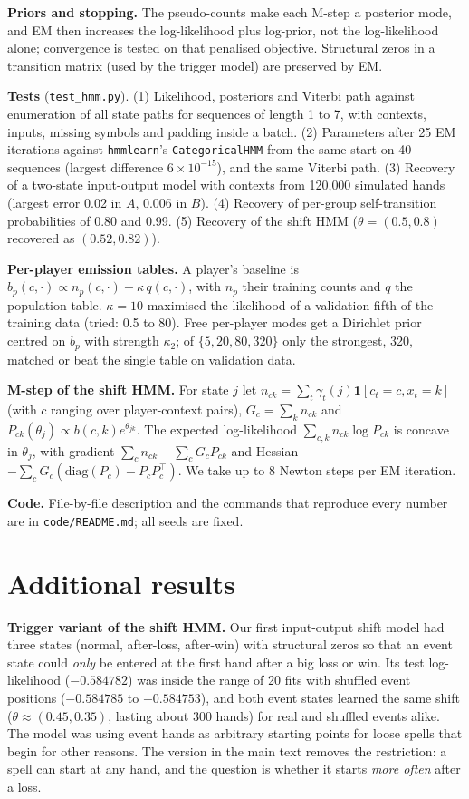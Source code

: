 \textbf{Priors and stopping.} The pseudo-counts make each M-step a posterior mode, and EM then increases the log-likelihood plus log-prior, not the log-likelihood alone; convergence is tested on that penalised objective. Structural zeros in a transition matrix (used by the trigger model) are preserved by EM.

\textbf{Tests} (\texttt{test\_hmm.py}). (1) Likelihood, posteriors and Viterbi path against enumeration of all state paths for sequences of length 1 to 7, with contexts, inputs, missing symbols and padding inside a batch. (2) Parameters after 25 EM iterations against \texttt{hmmlearn}'s \texttt{CategoricalHMM} from the same start on 40 sequences (largest difference $6\times10^{-15}$), and the same Viterbi path. (3) Recovery of a two-state input-output model with contexts from 120{,}000 simulated hands (largest error 0.02 in $A$, 0.006 in $B$). (4) Recovery of per-group self-transition probabilities of 0.80 and 0.99. (5) Recovery of the shift HMM ($\theta=(0.5,0.8)$ recovered as $(0.52,0.82)$).

\textbf{Per-player emission tables.} A player's baseline is $b_p(c,\cdot)\propto n_p(c,\cdot)+\kappa\,q(c,\cdot)$, with $n_p$ their training counts and $q$ the population table. $\kappa=10$ maximised the likelihood of a validation fifth of the training data (tried: 0.5 to 80). Free per-player modes get a Dirichlet prior centred on $b_p$ with strength $\kappa_2$; of $\{5,20,80,320\}$ only the strongest, 320, matched or beat the single table on validation data.

\textbf{M-step of the shift HMM.} For state $j$ let $n_{ck}=\sum_t\gamma_t(j)\mathbf 1[c_t=c,x_t=k]$ (with $c$ ranging over player-context pairs), $G_c=\sum_kn_{ck}$ and $P_{ck}(\theta_j)\propto b(c,k)e^{\theta_{jk}}$. The expected log-likelihood $\sum_{c,k}n_{ck}\log P_{ck}$ is concave in $\theta_j$, with gradient $\sum_cn_{ck}-\sum_cG_cP_{ck}$ and Hessian $-\sum_cG_c(\mathrm{diag}(P_c)-P_cP_c^\top)$. We take up to 8 Newton steps per EM iteration.

\textbf{Code.} File-by-file description and the commands that reproduce every number are in \texttt{code/README.md}; all seeds are fixed.

\section{Additional results}
\label{app:more}
\textbf{Trigger variant of the shift HMM.} Our first input-output shift model had three states (normal, after-loss, after-win) with structural zeros so that an event state could \emph{only} be entered at the first hand after a big loss or win. Its test log-likelihood ($-0.584782$) was inside the range of 20 fits with shuffled event positions ($-0.584785$ to $-0.584753$), and both event states learned the same shift ($\theta\approx(0.45,0.35)$, lasting about 300 hands) for real and shuffled events alike. The model was using event hands as arbitrary starting points for loose spells that begin for other reasons. The version in the main text removes the restriction: a spell can start at any hand, and the question is whether it starts \emph{more often} after a loss.

